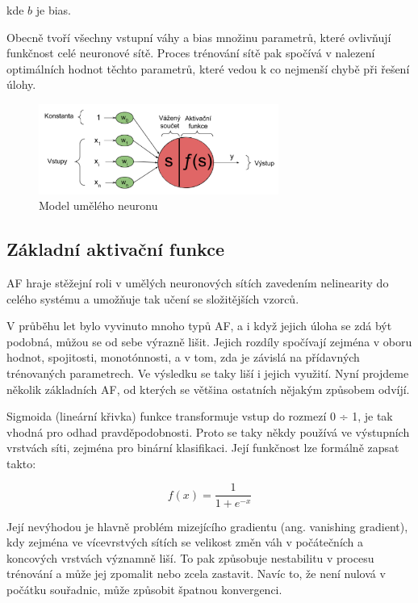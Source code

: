 kde $b$ je bias.

Obecně tvoří všechny vstupní váhy a bias množinu parametrů, které ovlivňují
funkčnost celé neuronové sítě. Proces trénování sítě pak spočívá v nalezení
optimálních hodnot těchto parametrů, které vedou k co nejmenší chybě při řešení
úlohy.

\begin{figure}[]
    \centering
    \includegraphics[width=0.7\textwidth]{Figures/neuron.png}
    \caption{Model umělého neuronu \cite{lagan}}
    \label{fig:neuron}
\end{figure}

\subsection{Základní aktivační funkce}

AF hraje stěžejní roli v umělých neuronových sítích zavedením nelinearity do
celého systému a umožňuje tak učení se složitějších vzorců.

V průběhu let bylo vyvinuto mnoho typů AF, a i když jejich úloha se zdá být
podobná, můžou se od sebe výrazně lišit. Jejich rozdíly spočívají zejména v
oboru hodnot, spojitosti, monotónnosti, a v tom, zda je závislá na přídavných
trénovaných parametrech. Ve výsledku se taky liší i jejich využití. Nyní
projdeme několik základních AF, od kterých se většina ostatních nějakým
způsobem odvíjí.

Sigmoida (lineární křivka) funkce transformuje vstup do rozmezí 0 ÷ 1, je tak
vhodná pro odhad pravděpodobnosti. Proto se taky někdy používá ve výstupních
vrstvách síti, zejména pro binární klasifikaci. Její funkčnost lze formálně
zapsat takto:

\begin{equation*}
    f(x)= \frac{1}{1+e^{-x}}
\end{equation*}

Její nevýhodou je hlavně problém mizejícího gradientu (ang. vanishing
gradient), kdy zejména ve vícevrstvých sítích se velikost změn váh v
počátečních a koncových vrstvách významně liší. To pak způsobuje nestabilitu v
procesu trénování a může jej zpomalit nebo zcela zastavit. Navíc to, že není
nulová v počátku souřadnic, může způsobit špatnou konvergenci.

